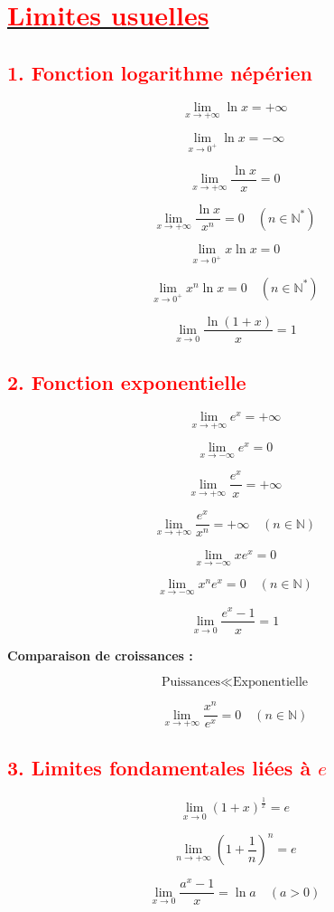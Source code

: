 \documentclass[12pt]{article}
\begin{document}
\section*{\underline{\textcolor{red}{Limites usuelles}}}

\subsection*{\textcolor{red}{1. Fonction logarithme népérien}}

\[
\lim_{x \to +\infty} \ln x = +\infty
\]

\[
\lim_{x \to 0^+} \ln x = -\infty
\]

\[
\lim_{x \to +\infty} \frac{\ln x}{x} = 0
\]

\[
\lim_{x \to +\infty} \frac{\ln x}{x^n} = 0 
\quad (n \in \mathbb{N}^*)
\]

\[
\lim_{x \to 0^+} x \ln x = 0
\]

\[
\lim_{x \to 0^+} x^n \ln x = 0 
\quad (n \in \mathbb{N}^*)
\]

\[
\lim_{x \to 0} \frac{\ln(1+x)}{x} = 1
\]

\subsection*{\textcolor{red}{2. Fonction exponentielle}}

\[
\lim_{x \to +\infty} e^x = +\infty
\]

\[
\lim_{x \to -\infty} e^x = 0
\]

\[
\lim_{x \to +\infty} \frac{e^x}{x} = +\infty
\]

\[
\lim_{x \to +\infty} \frac{e^x}{x^n} = +\infty
\quad (n \in \mathbb{N})
\]

\[
\lim_{x \to -\infty} x e^x = 0
\]

\[
\lim_{x \to -\infty} x^n e^x = 0
\quad (n \in \mathbb{N})
\]

\[
\lim_{x \to 0} \frac{e^x - 1}{x} = 1
\]

\textbf{Comparaison de croissances :}

\[
\text{Puissances} \ll \text{Exponentielle}
\]

\[
\lim_{x \to +\infty} \frac{x^n}{e^x} = 0
\quad (n \in \mathbb{N})
\]


\subsection*{\textcolor{red}{3. Limites fondamentales liées à \(e\)}}

\[
\lim_{x \to 0} (1+x)^{\frac{1}{x}} = e
\]

\[
\lim_{n \to +\infty} \left(1 + \frac{1}{n}\right)^n = e
\]

\[
\lim_{x \to 0} \frac{a^x - 1}{x} = \ln a 
\quad (a > 0)
\]
\end{document}
